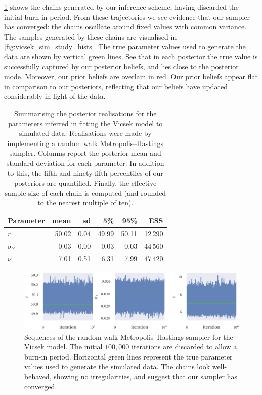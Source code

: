 \cref{fig:vicsek_sim_study_chains} shows the chains generated by our inference scheme,
having discarded the initial burn-in period. From these trajectories we see evidence that
our sampler has converged: the chains oscillate around fixed values with common
variance.  The samples generated by these chains are visualised in
\cref{fig:vicsek_sim_study_hists}.  The true parameter values used to generate the data
are shown by vertical green lines. See that in each posterior the true value is
successfully captured by our posterior beliefs, and lies close to the posterior mode.
Moreover, our prior beliefs are overlain in red. Our prior beliefs appear flat in
comparison to our posteriors, reflecting that our beliefs have updated considerably in
light of the data.
\begin{table}[tbp]
  \begin{tabular}{@{}lrrrrr@{}}
    \toprule
    Parameter    & mean  & sd   & 5\%   & 95\%  & ESS     \\
    \midrule
    $r$          & 50.02 & 0.04 & 49.99 & 50.11 & 12\,290 \\
    $\sigma_{Y}$ & 0.03  & 0.00 & 0.03  & 0.03  & 44\,560 \\
    $\nu$        & 7.01  & 0.51 & 6.31  & 7.99  & 47\,420 \\
    \bottomrule
  \end{tabular}
  \caption{Summarising the posterior realisations for the parameters inferred in fitting
    the Vicsek model to simulated data. Realisations were made by implementing a random
    walk Metropolis--Hastings sampler. Columns report the posterior mean and standard
    deviation for each parameter. In addition to this, the fifth and ninety-fifth
    percentiles of our posteriors are quantified. Finally, the effective sample size of each
    chain is computed (and rounded to the nearest multiple of ten).}
  \label{tab:vicsek_sim_study_summary}
\end{table}
\begin{figure}[tbp]
  \includegraphics{r_trace.pdf}
  \caption{Sequences of the random walk Metropolis--Hastings sampler for the Vicsek model.
    The initial $100,000$ iterations are discarded to allow a burn-in period. Horizontal
    green lines represent the true parameter values used to generate the simulated data.
    The chains look well-behaved, showing no irregularities, and suggest that our
    sampler has converged.}
  \label{fig:vicsek_sim_study_chains}
\end{figure}
